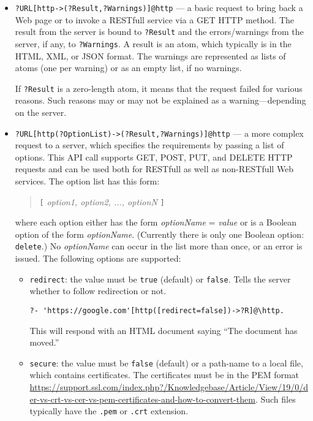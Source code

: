 \begin{itemize}
\item  \texttt{?URL[http->(?Result,?Warnings)]@\bs{}http} --- a basic
  request to bring back a Web page or to invoke a RESTfull service via a
  GET HTTP method. The result from the server is bound to \texttt{?Result}
  and the errors/warnings from the server, if any, to \texttt{?Warnings}. A
  result is an atom,
  which typically is in the HTML, XML, or JSON format.  
  The warnings are represented as lists of atoms (one per warning)
  or as an empty list, if no warnings.

  If \texttt{?Result} is a zero-length atom, it means that the request
  failed for various reasons. Such reasons may or may not be explained as a
  warning---depending on the server. 
\item  \texttt{?URL[http(?OptionList)->(?Result,?Warnings)]@\bs{}http} ---
  a more complex request to a server, which specifies the requirements by
  passing a list of options. This API call supports GET, POST, PUT, and DELETE
  HTTP requests and can be used both for RESTfull as well as non-RESTfull Web
  services. The option list has this form:
  \begin{quote}
     \texttt{[}  \emph{option1, option2, ..., optionN} \texttt{]}  
  \end{quote}
  where each option either has the form \emph{optionName} = \emph{value}
  or is a Boolean option of the form \emph{optionName}.   (Currently there
  is only one Boolean option: \texttt{delete}.) 
  No \emph{optionName}  can occur in the list more than once, or an error is
  issued.
  The following options are supported:
  \begin{itemize}
  \item    \texttt{redirect}: the value must be \texttt{true} (default) or
    \texttt{false}.   Tells the server whether to follow redirection or
    not.
\begin{verbatim}
?- 'https://google.com'[http([redirect=false])->?R]@\http.
\end{verbatim}
    This will respond with an HTML document saying ``The document has
    moved.''
  \item   \texttt{secure}: the value must be \texttt{false} (default)
    or a path-name to a local file, which contains certificates.
    The certificates must be in the PEM format
    \url{https://support.ssl.com/index.php?/Knowledgebase/Article/View/19/0/der-vs-crt-vs-cer-vs-pem-certificates-and-how-to-convert-them}. Such
    files typically have the \texttt{.pem} or \texttt{.crt} extension.


\end{itemize}
\end{itemize}
